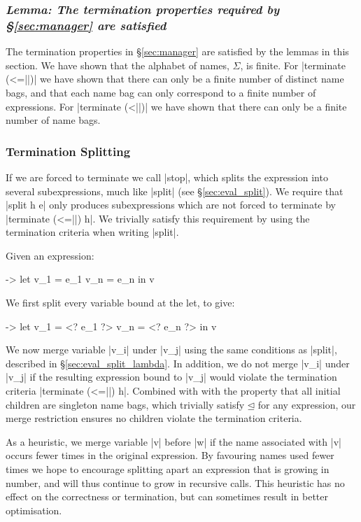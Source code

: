 \documentclass[draft]{sigplanconf}
\newcommand{\lemma}[1]{\subsubsection*{\textit{Lemma: #1}}}
\begin{document}
\lemma{The termination properties required by \S\ref{sec:manager} are satisfied}

The termination properties in \S\ref{sec:manager} are satisfied by the lemmas in this section. We have shown that the alphabet of names, $\Sigma$, is finite. For |terminate (<=||)| we have shown that there can only be a finite number of distinct name bags, and that each name bag can only correspond to a finite number of expressions. For |terminate (<||)| we have shown that there can only be a finite number of name bags.

\subsubsection{Termination Splitting}
\label{sec:term_split}

If we are forced to terminate we call |stop|, which splits the expression into several subexpressions, much like |split| (see \S\ref{sec:eval_split}). We require that |split h e| only produces subexpressions which are not forced to terminate by |terminate (<=||) h|. We trivially satisfy this requirement by using the termination criteria when writing |split|.

Given an expression:

\begin{code}
\free ->  let  v_1 = e_1
               v_n = e_n
          in   v
\end{code}

We first split every variable bound at the let, to give:

\begin{code}
\free ->  let  v_1 = <? e_1 ?>
               v_n = <? e_n ?>
          in   v
\end{code}

We now merge variable |v_i| under |v_j| using the same conditions as |split|, described in \S\ref{sec:eval_split_lambda}. In addition, we do not merge |v_i| under |v_j| if the resulting expression bound to |v_j| would violate the termination criteria |terminate (<=||) h|. Combined with with the property that all initial children are singleton name bags, which trivially satisfy $\unlhd$ for any expression, our merge restriction ensures no children violate the termination criteria.

As a heuristic, we merge variable |v| before |w| if the name associated with |v| occurs fewer times in the original expression. By favouring names used fewer times we hope to encourage splitting apart an expression that is growing in number, and will thus continue to grow in recursive calls. This heuristic has no effect on the correctness or termination, but can sometimes result in better optimisation.
\end{document}

